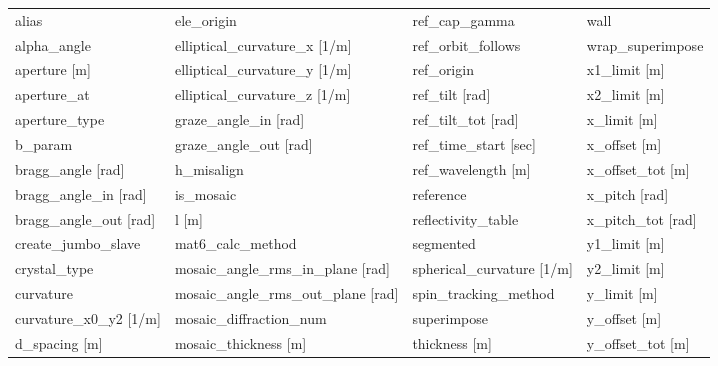  \begin{tabular}{llll} \toprule
alias                            & ele_origin                       & ref_cap_gamma                    & wall                             \\
alpha_angle                      & elliptical_curvature_x [1/m]     & ref_orbit_follows                & wrap_superimpose                 \\
aperture [m]                     & elliptical_curvature_y [1/m]     & ref_origin                       & x1_limit [m]                     \\
aperture_at                      & elliptical_curvature_z [1/m]     & ref_tilt [rad]                   & x2_limit [m]                     \\
aperture_type                    & graze_angle_in [rad]             & ref_tilt_tot [rad]               & x_limit [m]                      \\
b_param                          & graze_angle_out [rad]            & ref_time_start [sec]             & x_offset [m]                     \\
bragg_angle [rad]                & h_misalign                       & ref_wavelength [m]               & x_offset_tot [m]                 \\
bragg_angle_in [rad]             & is_mosaic                        & reference                        & x_pitch [rad]                    \\
bragg_angle_out [rad]            & l [m]                            & reflectivity_table               & x_pitch_tot [rad]                \\
create_jumbo_slave               & mat6_calc_method                 & segmented                        & y1_limit [m]                     \\
crystal_type                     & mosaic_angle_rms_in_plane [rad]  & spherical_curvature [1/m]        & y2_limit [m]                     \\
curvature                        & mosaic_angle_rms_out_plane [rad] & spin_tracking_method             & y_limit [m]                      \\
curvature_x0_y2 [1/m]            & mosaic_diffraction_num           & superimpose                      & y_offset [m]                     \\
d_spacing [m]                    & mosaic_thickness [m]             & thickness [m]                    & y_offset_tot [m]                 \\

\end{tabular}
